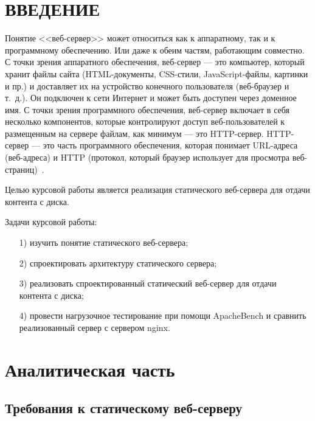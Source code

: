 \documentclass{bmstu}
\begin{document}
{\centering \chapter*{ВВЕДЕНИЕ}}

Понятие <<веб-сервер>> может относиться как к аппаратному, так и к программному обеспечению. 
Или даже к обеим частям, работающим совместно. 
С точки зрения аппаратного обеспечения, веб-сервер --- это компьютер, который хранит файлы сайта (HTML-документы, CSS-стили, JavaScript-файлы, картинки и пр.) и доставляет их на устройство конечного пользователя (веб-браузер и т.~д.). 
Он подключен к сети Интернет и может быть доступен через доменное имя. 
С точки зрения программного обеспечения, веб-сервер включает в себя несколько компонентов, которые контролируют доступ веб-пользователей к размещенным на сервере файлам, как минимум --- это HTTP-сервер. 
HTTP-сервер — это часть программного обеспечения, которая понимает URL-адреса (веб-адреса) и HTTP (протокол, который браузер использует для просмотра веб-страниц)~\cite{MdnWebServer2023}.

Целью курсовой работы является реализация статического веб-сервера для отдачи контента с диска.

Задачи курсовой работы:
\begin{enumerate}
\item[1)] изучить понятие статического веб-сервера;
\item[2)] спроектировать архитектуру статического сервера;
\item[3)] реализовать спроектированный статический веб-сервер для отдачи контента с диска;
\item[4)] провести нагрузочное тестирование при помощи ApacheBench и сравнить реализованный сервер с сервером nginx.
\end{enumerate}

\chapter{Аналитическая часть}

\section{Требования к статическому веб-серверу}
\end{document}
